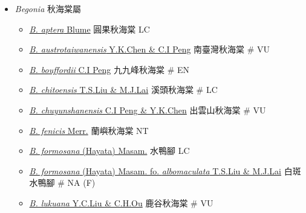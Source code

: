 
  \begin{itemize}
 \item[] \textit{Begonia} 秋海棠屬
                                
  \begin{itemize}
        \item[] \href{http://www.theplantlist.org/tpl1.1/search?q=Begonia+aptera}{\textit{B. aptera} Blume}   圓果秋海棠   LC
        \item[] \href{http://www.theplantlist.org/tpl1.1/search?q=Begonia+austrotaiwanensis}{\textit{B. austrotaiwanensis} Y.K.Chen \& C.I Peng}   南臺灣秋海棠  \# VU
        \item[] \href{http://www.theplantlist.org/tpl1.1/search?q=Begonia+bouffordii}{\textit{B. bouffordii} C.I Peng}   九九峰秋海棠  \# EN
        \item[] \href{http://www.theplantlist.org/tpl1.1/search?q=Begonia+chitoensis}{\textit{B. chitoensis} T.S.Liu \& M.J.Lai}   溪頭秋海棠  \# LC
        \item[] \href{http://www.theplantlist.org/tpl1.1/search?q=Begonia+chuyunshanensis}{\textit{B. chuyunshanensis} C.I Peng \& Y.K.Chen}   出雲山秋海棠  \# VU
        \item[] \href{http://www.theplantlist.org/tpl1.1/search?q=Begonia+fenicis}{\textit{B. fenicis} Merr.}   蘭嶼秋海棠   NT
        \item[] \href{http://www.theplantlist.org/tpl1.1/search?q=Begonia+formosana}{\textit{B. formosana} (Hayata) Masam.}   水鴨腳   LC
        \item[] \href{http://www.theplantlist.org/tpl1.1/search?q=Begonia+formosana+fo.+albomaculata}{\textit{B. formosana} (Hayata) Masam. fo. \textit{albomaculata} T.S.Liu \& M.J.Lai}   白斑水鴨腳  \# NA (F)
        \item[] \href{http://www.theplantlist.org/tpl1.1/search?q=Begonia+lukuana}{\textit{B. lukuana} Y.C.Liu \& C.H.Ou}   鹿谷秋海棠  \# VU

\end{itemize}
\end{itemize}
